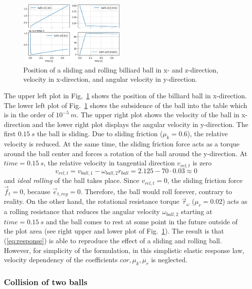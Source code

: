%
\begin{figure}[tb]
	\centering
	\includegraphics[width=0.47\textwidth]{figures/rollingBall_plot.pdf}
	\caption{Position of a sliding and rolling billiard ball in x- and z-direction, velocity in x-direction, and angular velocity in y-direction.}
	\label{fig:rollingBall_plot}
\end{figure}
%
The upper left plot in Fig,~\ref{fig:rollingBall_plot} shows the position of the billiard ball in x-direction. 
The lower left plot of Fig.~\ref{fig:rollingBall_plot} shows the subsidence of the ball into the table 
which is in the order of $10^{-5}~m$. The upper right plot shows the velocity of the ball in 
x-direction and the lower right plot displays the angular velocity in y-direction.
The first $0.15~s$ the ball is sliding. Due to sliding friction ($\mu_k = 0.6$), the relative velocity is reduced.
At the same time, the sliding friction force acts as a torque around the ball center and forces a rotation of
the ball around the y-direction. At $time = 0.15~s$, the relative velocity in tangential direction $v_{rel,t}$ is zero 
\begin{equation}
v_{rel,t} = v_{ball,1} - \omega_{ball,2} r_{ball} = 2.125 - 70 \cdot 0.03 \approx 0 
\end{equation}
and \emph{ideal rolling} of the ball takes place. Since $v_{rel,t} =0$, the sliding friction force
$\vec{f}_t = 0$, because $\vec{e}_{t,reg}=0$. Therefore, the ball would roll forever, contrary to reality.
On the other hand, the rotational resistance torque $\vec{\tau}_{\omega}$ ($\mu_r = 0.02$) acts as a
rolling resistance that reduces the
angular velocity $\omega_{ball,2}$ starting at $time = 0.15~s$ and the ball comes to rest at 
some point in the future outside of the plot area (see right upper and lower plot of 
Fig.~\ref{fig:rollingBall_plot}). The result is that
(\ref{eq:response}) is able to reproduce the effect of a sliding and rolling 
ball. However, for simplicity of the formulation, in this simplistic elastic
response law, velocity dependency of the coefficients $cor, \mu_k, \mu_r$ is neglected.


\subsubsection*{Collision of two balls}

